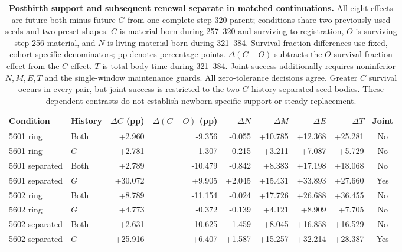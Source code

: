 \begin{table}[!htbp]
\centering
\small
\setlength{\tabcolsep}{3pt}
\begin{tabular}{llrrrrrrc}
\toprule
Condition & History & $\Delta C$ (pp) & $\Delta(C-O)$ (pp) & $\Delta N$ & $\Delta M$ & $\Delta E$ & $\Delta T$ & Joint \\
\midrule
5601 ring & Both & +2.960 & -9.356 & -0.055 & +10.785 & +12.368 & +25.281 & No \\
5601 ring & $G$ & +2.781 & -1.307 & -0.215 & +3.211 & +7.087 & +5.729 & No \\
5601 separated & Both & +2.789 & -10.479 & -0.842 & +8.383 & +17.198 & +18.068 & No \\
5601 separated & $G$ & +30.072 & +9.905 & +2.045 & +15.431 & +33.893 & +27.660 & Yes \\
5602 ring & Both & +8.789 & -11.154 & -0.024 & +17.726 & +26.688 & +36.455 & No \\
5602 ring & $G$ & +4.773 & -0.372 & -0.139 & +4.121 & +8.909 & +7.705 & No \\
5602 separated & Both & +2.631 & -10.625 & -1.459 & +8.045 & +16.858 & +16.529 & No \\
5602 separated & $G$ & +25.916 & +6.407 & +1.587 & +15.257 & +32.214 & +28.387 & Yes \\
\bottomrule
\end{tabular}
\caption{\textbf{Postbirth support and subsequent renewal separate in matched continuations.} All eight effects are future both minus future $G$ from one complete step-320 parent; conditions share two previously used seeds and two preset shapes. $C$ is material born during 257--320 and surviving to registration, $O$ is surviving step-256 material, and $N$ is living material born during 321--384. Survival-fraction differences use fixed, cohort-specific denominators; pp denotes percentage points. $\Delta(C-O)$ subtracts the $O$ survival-fraction effect from the $C$ effect. $T$ is total body-time during 321--384. Joint success additionally requires noninferior $N,M,E,T$ and the single-window maintenance guards. All zero-tolerance decisions agree. Greater $C$ survival occurs in every pair, but joint success is restricted to the two $G$-history separated-seed bodies. These dependent contrasts do not establish newborn-specific support or steady replacement.}
\label{tab:postbirth-crossover}
\end{table}
